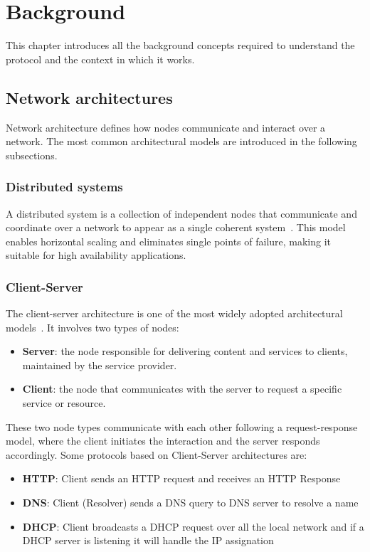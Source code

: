 \chapter{Background} \label{ch:background}
This chapter introduces all the background concepts required to understand the protocol and the context in which it works.
\section{Network architectures} \label{sec:network-architectures}
Network architecture defines how nodes communicate and interact over a network.
The most common architectural models are introduced in the following subsections.
\subsection{Distributed systems} \label{subsec:distributed-systems}
A distributed system is a collection of independent nodes that communicate and coordinate over a network to appear as a single coherent system~\cite{van2002distributed}.
This model enables horizontal scaling and eliminates single points of failure, making it suitable for high availability applications.
\subsection{Client-Server} \label{subsec:client-server}
The client-server architecture is one of the most widely adopted
architectural models~\cite{van2002distributed}.
It involves two types of nodes:
\begin{itemize}
    \item \textbf{Server}: the node responsible for delivering content
    and services to clients, maintained by the service provider.
    \item \textbf{Client}: the node that communicates with the server
    to request a specific service or resource.
\end{itemize}
These two node types communicate with each other following a
request-response model, where the client initiates the interaction
and the server responds accordingly.
\newline
Some protocols based on Client-Server architectures are:
\begin{itemize}
    \item \textbf{HTTP}: Client sends an HTTP request and receives an HTTP Response~\cite{rfc9110}
    \item \textbf{DNS}: Client (Resolver) sends a DNS query to DNS server to resolve a name~\cite{rfc1034}
    \item \textbf{DHCP}: Client broadcasts a DHCP request over all the local network and if a DHCP server is listening it will handle the IP assignation~\cite{rfc2131}
\end{itemize}

